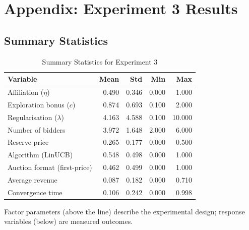 \section{Appendix: Experiment 3 Results}

\subsection{Summary Statistics}
\begin{table}[H]
\centering
\caption{Summary Statistics for Experiment 3}
\label{tab:summary_statistics_exp3}
\small
\begin{tabular}{lrrrr}
\toprule
\textbf{Variable} & \textbf{Mean} & \textbf{Std} & \textbf{Min} & \textbf{Max} \\
\midrule
Affiliation ($\eta$) & 0.490 & 0.346 & 0.000 & 1.000 \\
Exploration bonus ($c$) & 0.874 & 0.693 & 0.100 & 2.000 \\
Regularisation ($\lambda$) & 4.163 & 4.588 & 0.100 & 10.000 \\
Number of bidders & 3.972 & 1.648 & 2.000 & 6.000 \\
Reserve price & 0.265 & 0.177 & 0.000 & 0.500 \\
Algorithm (LinUCB) & 0.548 & 0.498 & 0.000 & 1.000 \\
Auction format (first-price) & 0.462 & 0.499 & 0.000 & 1.000 \\
\midrule
Average revenue & 0.087 & 0.182 & 0.000 & 0.710 \\
Convergence time & 0.106 & 0.242 & 0.000 & 0.998 \\
\bottomrule
\end{tabular}
\par\smallskip\footnotesize
Factor parameters (above the line) describe the experimental design; response variables (below) are measured outcomes.
\end{table}
